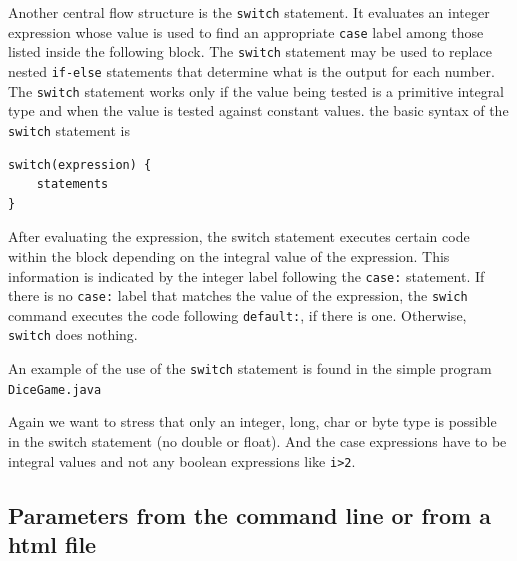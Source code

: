 Another central flow structure is the \verb|switch| statement. It
evaluates an integer expression whose value is used to find an
appropriate \verb|case| label among those listed inside the following
block. The \verb|switch| statement may be used to replace nested \verb|if-else|
statements that determine what is the output for each number. The
\verb|switch| statement works only if the value being tested is a
primitive integral type and when the value is tested against constant
values. the basic syntax of the \verb|switch| statement is
\begin{verbatim}
switch(expression) {
    statements
}
\end{verbatim}
After evaluating the expression, the switch statement executes
certain code within the block depending on the integral value of the
expression. This information is indicated by the integer label following
the \verb|case:| statement. If there is no \verb|case:| label that
matches the value of the expression, the \verb|swich| command executes
the code following \verb|default:|, if there is one. Otherwise,
\verb|switch| does nothing.

An example of the use of the \verb|switch| statement is found in the
simple program \verb|DiceGame.java| 


Again we want to stress that only an integer, long, char or byte type
is possible in the switch statement (no double or float). And the
case expressions have to be integral values and not any boolean
expressions like \verb|i>2|. 

\subsection{Parameters from the command line or from a html file}
\label{sec:Parameter}

